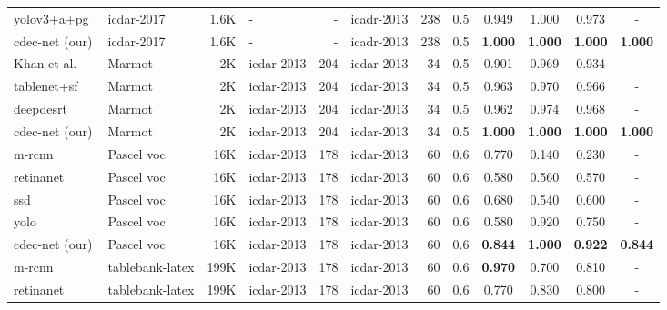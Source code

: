 \documentclass[a4paper,conference]{IEEEtran}
\begin{document}
\begin{table*}
\begin{center}
\begin{tabular}{|l| l | r|l |r|l|r| c| c c c c|}
\hhline{|=|=|=|=|=|=|=|=|====|}  
{\sc yolo}v3+{\sc a}+{\sc pg}~\cite{huang2019yolo} &{\sc icdar}-2017 &1.6K &- &- &{\sc icadr}-2013 &238 &0.5 &0.949 &1.000 &0.973 &- \\ 
{\sc cd}e{\sc c-n}et (our)        &{\sc icdar}-2017 &1.6K &- &- &{\sc icadr}-2013 &238 &0.5 &\textbf{1.000} &\textbf{1.000} &\textbf{1.000} &\textbf{1.000} \\ \hhline{|=|=|=|=|=|=|=|=|====|} 
Khan et al.~\cite{khan2019table} &Marmot &2K &{\sc icdar}-2013 &204 &{\sc icdar}-2013 &34 &0.5 &0.901& 0.969& 0.934 &- \\   
{\sc t}able{\sc n}et+{\sc sf}~\cite{paliwal2019tablenet} &Marmot &2K &{\sc icdar}-2013 &204 &{\sc icdar}-2013 &34 &0.5 &0.963 & 0.970 & 0.966 &- \\ 
{\sc d}eep{\sc d}e{\sc srt}~\cite{schreiber2017deepdesrt} &Marmot &2K &{\sc icdar}-2013 &204 &{\sc icdar}-2013 &34 &0.5 &0.962 &0.974 &0.968 &- \\ 
{\sc cd}e{\sc c-n}et (our)                                                      &Marmot &2K &{\sc icdar}-2013 &204 &{\sc icdar}-2013 &34 &0.5 &\textbf{1.000} &\textbf{1.000} &\textbf{1.000} &\textbf{1.000} \\ 
\hhline{|=|=|=|=|=|=|=|=|====|} 
{\sc m-rcnn}~\cite{casado2019benefits} &Pascel {\sc voc} &16K &{\sc icdar}-2013 &178 &{\sc icdar}-2013 &60 &0.6 &0.770 &0.140 &0.230 &- \\
{\sc r}etina{\sc n}et~\cite{casado2019benefits} &Pascel {\sc voc} &16K &{\sc icdar}-2013 &178 &{\sc icdar}-2013 &60 &0.6 &0.580 &0.560 &0.570 &- \\ 
{\sc ssd}~\cite{casado2019benefits} &Pascel {\sc voc} &16K &{\sc icdar}-2013 &178 &{\sc icdar}-2013 &60 &0.6 &0.680 &0.540 &0.600 &- \\ 
{\sc yolo}~\cite{casado2019benefits} &Pascel {\sc voc} &16K &{\sc icdar}-2013 &178 &{\sc icdar}-2013 &60 &0.6 &0.580 &0.920 &0.750 &- \\     
{\sc cd}e{\sc c-n}et (our) &Pascel {\sc voc} &16K &{\sc icdar}-2013 &178 &{\sc icdar}-2013 &60 &0.6 &\textbf{0.844} &\textbf{1.000} &\textbf{0.922} &\textbf{0.844} \\ \hhline{|=|=|=|=|=|=|=|=|====|}
{\sc m-rcnn}~\cite{casado2019benefits} &{\sc t}able{\sc b}ank-{\sc l}a{\sc t}e{\sc x} &199K &{\sc icdar}-2013 &178 &{\sc icdar}-2013 &60 &0.6 &\textbf{0.970} &0.700 &0.810 &- \\   
{\sc r}etina{\sc n}et~\cite{casado2019benefits} &{\sc t}able{\sc b}ank-{\sc l}a{\sc t}e{\sc x} &199K &{\sc icdar}-2013 &178 &{\sc icdar}-2013 &60 &0.6 &0.770 &0.830 &0.800 &- \\   

\end{tabular}
\end{center}
\end{table*}
\end{document}
